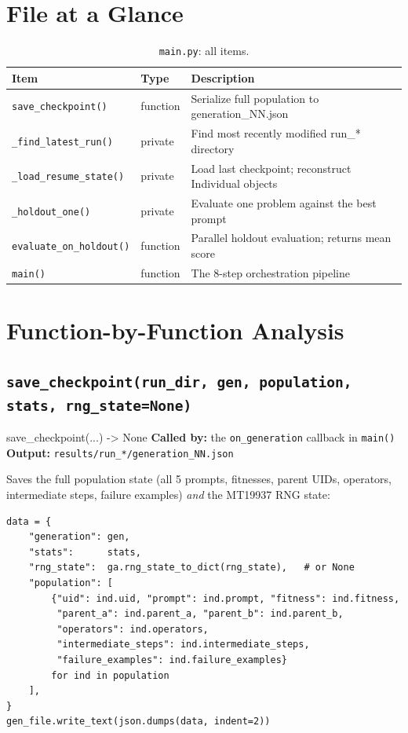 \documentclass[11pt,a4paper]{report}
\newcommand{\pyfile}[1]{\texttt{#1}}
\newcommand{\fn}[1]{\texttt{#1}}
\begin{document}
\section{File at a Glance}

\begin{table}[h]
\centering
\begin{tabular}{@{}llp{8cm}@{}}
\toprule
\textbf{Item} & \textbf{Type} & \textbf{Description} \\
\midrule
\fn{save\_checkpoint()}      & function & Serialize full population to generation\_NN.json \\
\fn{\_find\_latest\_run()}   & private  & Find most recently modified run\_* directory \\
\fn{\_load\_resume\_state()} & private  & Load last checkpoint; reconstruct Individual objects \\
\fn{\_holdout\_one()}        & private  & Evaluate one problem against the best prompt \\
\fn{evaluate\_on\_holdout()} & function & Parallel holdout evaluation; returns mean score \\
\fn{main()}                  & function & The 8-step orchestration pipeline \\
\bottomrule
\end{tabular}
\caption{\pyfile{main.py}: all items.}
\end{table}

\section{Function-by-Function Analysis}

\subsection{\fn{save\_checkpoint(run\_dir, gen, population, stats, rng\_state=None)}}

\begin{specbox}{save\_checkpoint(...) -> None}
\textbf{Called by:} the \fn{on\_generation} callback in \fn{main()}\\
\textbf{Output:} \fn{results/run\_*/generation\_NN.json}
\end{specbox}

Saves the full population state (all 5 prompts, fitnesses, parent UIDs, operators,
intermediate steps, failure examples) \emph{and} the MT19937 RNG state:

\begin{lstlisting}[style=example]
data = {
    "generation": gen,
    "stats":      stats,
    "rng_state":  ga.rng_state_to_dict(rng_state),   # or None
    "population": [
        {"uid": ind.uid, "prompt": ind.prompt, "fitness": ind.fitness,
         "parent_a": ind.parent_a, "parent_b": ind.parent_b,
         "operators": ind.operators,
         "intermediate_steps": ind.intermediate_steps,
         "failure_examples": ind.failure_examples}
        for ind in population
    ],
}
gen_file.write_text(json.dumps(data, indent=2))
\end{lstlisting}
\end{document}
